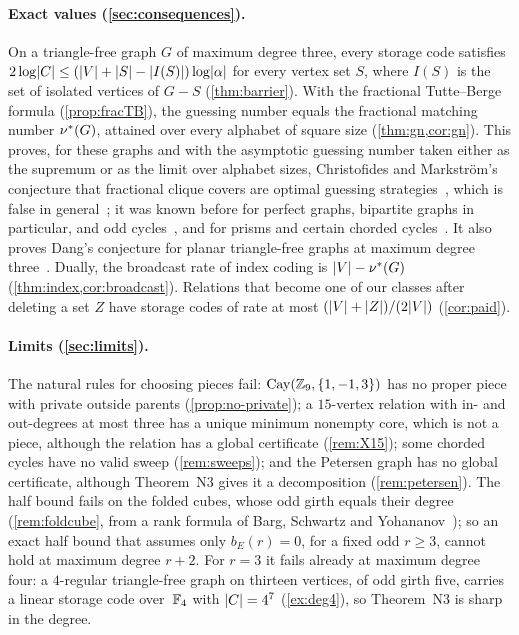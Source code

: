 \paragraph{Exact values (\cref{sec:consequences}).} On a triangle-free graph $G$ of maximum degree three, every storage code
satisfies $2\log\lvert C \rvert\le(\lvert V \rvert+\lvert S \rvert-\lvert I(S) \rvert)\log\lvert \alpha \rvert$ for every vertex set $S$, where $I(S)$ is the set
of isolated vertices of $G-S$ (\cref{thm:barrier}). With the fractional Tutte--Berge formula (\cref{prop:fracTB}), the
guessing number equals the fractional matching number $\nu^{*}(G)$, attained over every alphabet of square size
(\cref{thm:gn,cor:gn}). This proves, for these graphs and with the asymptotic guessing number taken either as the
supremum or as the limit over alphabet sizes, Christofides and Markström's conjecture that fractional clique covers are
optimal guessing strategies~\cite{ChristofidesMarkstrom2011,Dang2015}, which is false in
general~\cite{Baber2017,CameronDangRiis2016}; it was known before for perfect graphs, bipartite graphs in particular, and odd
cycles~\cite{ChristofidesMarkstrom2011}, and for prisms and certain chorded cycles~\cite{MMV2019}. It also proves Dang's
conjecture for planar triangle-free graphs at maximum degree three~\cite[Conjecture~15]{Dang2015}. Dually, the broadcast
rate of index coding is $\lvert V \rvert-\nu^{*}(G)$ (\cref{thm:index,cor:broadcast}). Relations that become one of our classes
after deleting a set $Z$ have storage codes of rate at most
$(\lvert V \rvert+\lvert Z \rvert)/(2\lvert V \rvert)$ (\cref{cor:paid}).

\paragraph{Limits (\cref{sec:limits}).} The natural rules for choosing pieces fail: $\operatorname{Cay}(\mathbb{Z}_9,\{1,-1,3\})$ has no proper
piece with private outside parents (\cref{prop:no-private}); a $15$-vertex relation with in- and out-degrees at most three
has a unique minimum nonempty core, which is not a piece, although the relation has a global certificate
(\cref{rem:X15}); some chorded cycles have no valid sweep (\cref{rem:sweeps}); and the Petersen graph has no global
certificate, although Theorem~N3 gives it a decomposition (\cref{rem:petersen}). The half bound fails on the folded
cubes, whose odd girth equals their degree (\cref{rem:foldcube}, from a rank formula of Barg, Schwartz and
Yohananov~\cite{BSY2024}); so an exact half bound that assumes only $b_E(r)=0$, for a fixed odd $r\ge3$, cannot
hold at maximum degree $r+2$. For $r=3$ it fails already at maximum degree four: a $4$-regular triangle-free graph on
thirteen vertices, of odd girth five, carries a linear storage code over~$\mathbb{F}_4$ with $\lvert C \rvert=4^7$ (\cref{ex:deg4}), so
Theorem~N3 is sharp in the degree.

